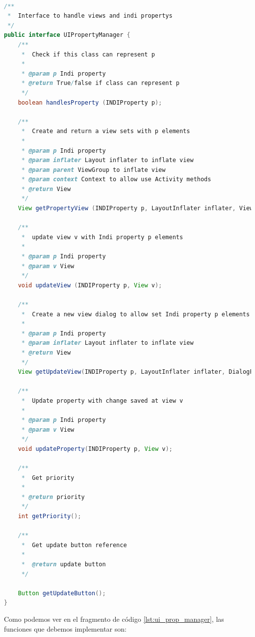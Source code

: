 \begin{lstlisting}[language=Java,caption={Interfaz UIPropertyManager},label={lst:ui_prop_manager}]

/**
 *  Interface to handle views and indi propertys
 */
public interface UIPropertyManager {
    /**
     *  Check if this class can represent p
     *
     * @param p Indi property
     * @return True/false if class can represent p
     */
    boolean handlesProperty (INDIProperty p);

    /**
     *  Create and return a view sets with p elements
     *
     * @param p Indi property
     * @param inflater Layout inflater to inflate view
     * @param parent ViewGroup to inflate view
     * @param context Context to allow use Activity methods
     * @return View
     */
    View getPropertyView (INDIProperty p, LayoutInflater inflater, ViewGroup parent, Context context);

    /**
     *  update view v with Indi property p elements
     *
     * @param p Indi property
     * @param v View
     */
    void updateView (INDIProperty p, View v);

    /**
     *  Create a new view dialog to allow set Indi property p elements
     *
     * @param p Indi property
     * @param inflater Layout inflater to inflate view
     * @return View
     */
    View getUpdateView(INDIProperty p, LayoutInflater inflater, DialogFragment fragment);

    /**
     *  Update property with change saved at view v
     *
     * @param p Indi property
     * @param v View
     */
    void updateProperty(INDIProperty p, View v);

    /**
     *  Get priority
     *
     * @return priority
     */
    int getPriority();

    /**
     *  Get update button reference
     *
     *  @return update button
     */

    Button getUpdateButton();
}

\end{lstlisting}

\bigskip
Como podemos ver en el fragmento de código \ref{lst:ui_prop_manager}, las funciones que debemos implementar son:


